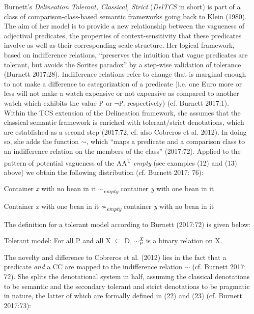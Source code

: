\documentclass[output=paper
,modfonts
,nonflat]{langsci/langscibook}
\begin{document}
Burnett's \textit{Delineation Tolerant, Classical, Strict} (\textit{DelTCS} in short) is part of a class of comparison-class-based semantic frameworks going back to Klein (1980). The aim of her model is to provide a new relationship between the vagueness of adjectival predicates, the properties of context-sensitivity that these predicates involve as well as their corresponding scale structure. Her logical framework, based on indifference relations, ``preserves the intuition that vague predicates are tolerant, but avoids the Sorites paradox'' by a step-wise validation of tolerance (Burnett 2017:28). Indifference relations refer to change that is marginal enough to not make a difference to categorization of a predicate (i.e. one Euro more or less will not make a watch expensive or not expensive as compared to another watch which exhibits the value P or $\neg$P, respectively) (cf. Burnett 2017:1). Within the TCS extension of the Delineation framework, she assumes that the classical semantic framework is enriched with tolerant/strict denotations, which are established as a second step (2017:72, cf. also Cobreros et al. 2012). In doing so, she adds the function $\sim$, which ``maps a predicate and a comparison class to an indifference relation on the members of the class'' (2017:72). Applied to the pattern of potential vagueness of the AA\textsuperscript{T} \textit{empty} (see examples (12) and (13) above) we obtain the following distribution (cf. Burnett 2017: 76):
\begin{examples}
	\item Container \textit{x} with no bean in it $\sim$\textsubscript{\textit{empty}} container \textit{y} with one bean in it
	\item Container \textit{x} with one bean in it $\not\sim$\textsubscript{\textit{empty}} container \textit{y} with no bean in it
\end{examples}

The definition for a tolerant model according to Burnett (2017:72) is given below:
\begin{examples}
	\item Tolerant model: For all P and all X $\subseteq$ D, $\sim_P^X$ is a binary relation on X.
\end{examples}

The novelty and difference to Cobreros et al. (2012) lies in the fact that a predicate \textit{and} a CC are mapped to the indifference relation $\sim$ (cf. Burnett 2017: 72). 
She splits the denotational system in half, assuming the classical denotations to be semantic and the secondary tolerant and strict denotations to be pragmatic in nature, the latter of which are formally defined in (22) and (23) (cf. Burnett 2017:73):
\end{document}
